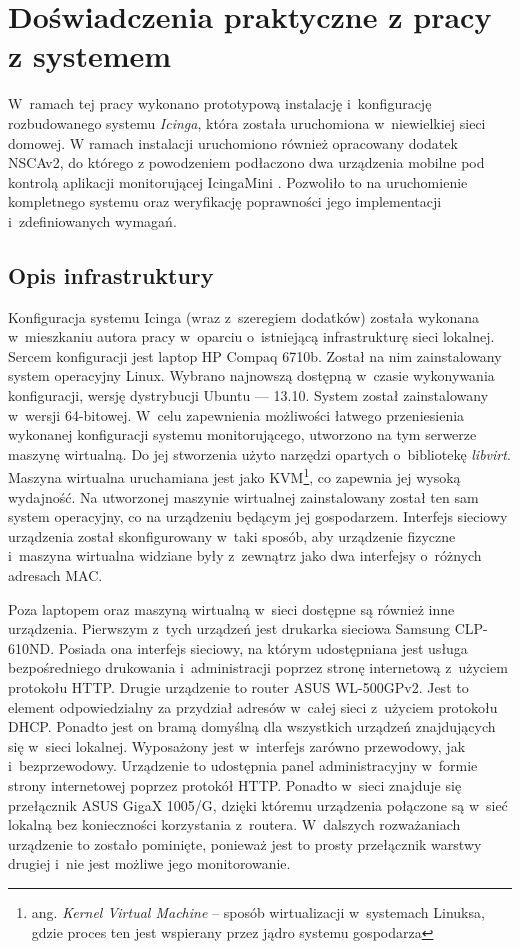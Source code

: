 \chapter{Doświadczenia praktyczne z pracy z systemem}
\label{chap:Testy}

 

 W~ramach tej pracy wykonano prototypową instalację i~konfigurację
 rozbudowanego systemu {\em Icinga}, która została uruchomiona
 w~niewielkiej sieci domowej. W ramach instalacji uruchomiono również
 opracowany dodatek NSCAv2, do którego z powodzeniem podłaczono dwa
 urządzenia mobilne pod kontrolą aplikacji monitorującej IcingaMini
 \cite{book:pracaKubika}. Pozwoliło to na uruchomienie kompletnego
 systemu oraz weryfikację poprawności jego implementacji
 i~zdefiniowanych wymagań.

\section[Opis infrastruktury][Opis infrastruktury]{Opis infrastruktury}

Konfiguracja systemu Icinga (wraz z~szeregiem dodatków) została
wykonana w~mieszkaniu autora pracy w~oparciu o~istniejącą
infrastrukturę sieci lokalnej. Sercem konfiguracji jest laptop HP
Compaq 6710b. Został na nim zainstalowany system operacyjny
Linux. Wybrano najnowszą dostępną w~czasie wykonywania konfiguracji,
wersję dystrybucji Ubuntu --- 13.10. System został zainstalowany
w~wersji 64-bitowej. W~celu zapewnienia możliwości łatwego
przeniesienia wykonanej konfiguracji systemu monitorującego, utworzono
na tym serwerze maszynę wirtualną. Do jej stworzenia użyto narzędzi
opartych o~bibliotekę {\em libvirt}. Maszyna wirtualna uruchamiana
jest jako KVM\footnote{ang. {\em Kernel Virtual Machine} -- sposób
  wirtualizacji w~systemach Linuksa, gdzie proces ten jest wspierany
  przez jądro systemu gospodarza}, co zapewnia jej wysoką
wydajność. Na utworzonej maszynie wirtualnej zainstalowany został ten
sam system operacyjny, co na urządzeniu będącym jej
gospodarzem. Interfejs sieciowy urządzenia został skonfigurowany
w~taki sposób, aby urządzenie fizyczne i~maszyna wirtualna widziane
były z~zewnątrz jako dwa interfejsy o~różnych adresach MAC.

Poza laptopem oraz maszyną wirtualną w~sieci dostępne są również inne
urządzenia. Pierwszym z~tych urządzeń jest drukarka sieciowa Samsung
CLP-610ND. Posiada ona interfejs sieciowy, na którym udostępniana jest
usługa bezpośredniego drukowania i~administracji poprzez stronę
internetową z~użyciem protokołu HTTP. Drugie urządzenie to router ASUS
WL-500GPv2. Jest to element odpowiedzialny za przydział adresów
w~całej sieci z~użyciem protokołu DHCP. Ponadto jest on bramą domyślną
dla wszystkich urządzeń znajdujących się w~sieci lokalnej. Wyposażony
jest w~interfejs zarówno przewodowy, jak i~bezprzewodowy. Urządzenie
to udostępnia panel administracyjny w~formie strony internetowej
poprzez protokół HTTP. Ponadto w~sieci znajduje się przełącznik ASUS
GigaX 1005/G, dzięki któremu urządzenia połączone są w~sieć lokalną
bez konieczności korzystania z~routera. W~dalszych rozważaniach
urządzenie to zostało pominięte, ponieważ jest to prosty przełącznik
warstwy drugiej i~nie jest możliwe jego monitorowanie.

